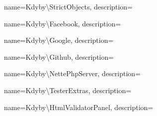  {
  name={Kdy\-by\textbackslash{}Stri\-ct\-Ob\-je\-ct\-s},
  description={} }

 {
  name={Kdy\-by\textbackslash{}Fa\-ce\-book},
  description={} }

 {
  name={Kdy\-by\textbackslash{}Google},
  description={} }

 {
  name={Kdy\-by\textbackslash{}Git\-hub},
  description={} }

 {
  name={Kdy\-by\textbackslash{}Nette\-Php\-Ser\-ver},
  description={} }

 {
  name={Kdy\-by\textbackslash{}Tes\-ter\-Ex\-tras},
  description={} }

 {
  name={Kdy\-by\textbackslash{}Html\-Va\-li\-da\-tor\-Pa\-nel},
  description={} }
